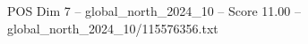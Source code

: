 \begin{textsample}{POS Dim 7 – global\_north\_2024\_10 – Score 11.00 – global\_north\_2024\_10/115576356.txt}
\end{textsample}
